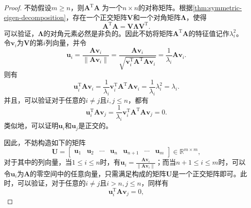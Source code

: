 \begin{proof}
    不妨假设\( m \geq n \)，则\( \mathbf{A}^{\mathrm{T}} \mathbf{A} \) 为一个\( n \times n \)的对称矩阵。根据\cref{thm:symmetric-eigen-decomposition}，存在一个正交矩阵\( \mathbf{V} \)和一个对角矩阵\( \mathbf{\Lambda} \)，使得
    \[
        \mathbf{A}^{\mathrm{T}} \mathbf{A} = \mathbf{V} \mathbf{\Lambda} \mathbf{V}^{\mathrm{T}}.
    \]
    可以验证，\( \mathbf{\Lambda} \)的对角元素必然是非负的。因此不妨将矩阵\( \mathbf{A}^{\mathrm{T}} \mathbf{A} \)的特征值记作\( \lambda_i^2 \)。令\( \bm{v}_i \)为\( \mathbf{V} \)的第\( i \)列向量，并令
    \[
        \bm{u}_i = \frac{\mathbf{A} \bm{v}_i}{\|\mathbf{A} \bm{v}_i\|} = \frac{\mathbf{A} \bm{v}_i}{\sqrt{\bm{v}_i^{\mathrm{T}} \mathbf{A}^{\mathrm{T}} \mathbf{A} \bm{v}_i}} = \frac{1}{\lambda_i} \mathbf{A} \bm{v}_i.
    \]
    则有
    \begin{equation}\label{eq:svd_proof1}
        \bm{u}_i^{\mathrm{T}} \mathbf{A} \bm{v}_i = \frac{1}{\lambda_i} \bm{v}_i^{\mathrm{T}} \mathbf{A}^{\mathrm{T}} \mathbf{A} \bm{v}_i = \frac{1}{\lambda_i} \lambda_i^2 = \lambda_i.
    \end{equation}
    并且，可以验证对于任意的\( i \neq j  \)且\( i, j \leq n \)，都有
    \begin{equation}\label{eq:svd_proof2}
        \bm{u}_i^{\mathrm{T}} \mathbf{A} \bm{v}_j = \frac{1}{\lambda_i} \bm{v}_i^{\mathrm{T}} \mathbf{A}^{\mathrm{T}} \mathbf{A} \bm{v}_j = 0.
    \end{equation}
    类似地，可以证明\( \bm{u}_i \)和\( \bm{u}_j \)是正交的。

    因此，不妨构造如下的矩阵
    \[
        \mathbf{U} =
        \begin{bmatrix}
            \bm{u}_1 & \bm{u}_2 & \cdots & \bm{u}_n & \bm{u}_{n+1} & \cdots & \bm{u}_m
        \end{bmatrix} \in \mathbb{R}^{m \times m},
    \]
    对于其中的列向量，当\( 1 \leq i \leq n \)时，有\( \bm{u}_i = \frac{\mathbf{A} \bm{v}_i}{\|\mathbf{A} \bm{v}_i\|} \)；而当\( n + 1 \leq i \leq m \)时，可以令\( \bm{u}_i \)为\( \mathbf{A} \)的零空间中的任意向量，只需满足构成的矩阵\( \mathbf{U} \)是一个正交矩阵即可。此时，可以验证，对于任意的\( i \neq j  \)且\( i > n, j \leq n\)，同样有
    \begin{equation}\label{eq:svd_proof3}
        \bm{u}_i^{\mathrm{T}} \mathbf{A} \bm{v}_j = 0,
    \end{equation}


\end{proof}
